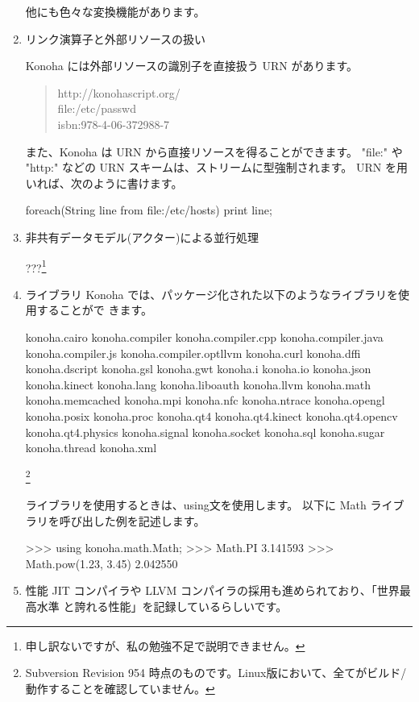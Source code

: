 \documentclass[mingoth,a4paper]{jsarticle}
\begin{document}
\begin{enumerate}
他にも色々な変換機能があります。
\\
\item リンク演算子と外部リソースの扱い

Konoha には外部リソースの識別子を直接扱う URN があります。

\begin{quote}
    http://konohascript.org/\\
    file:/etc/passwd\\
    isbn:978-4-06-372988-7
\end{quote}

また、Konoha は URN から直接リソースを得ることができます。
"file:" や "http:" などの URN スキームは、ストリームに型強制されます。
URN を用いれば、次のように書けます。

\begin{commandline}
foreach(String line from file:/etc/hosts) {
  print line;
}
\end{commandline}

\item 非共有データモデル(アクター)による並行処理

  ???\footnote{申し訳ないですが、私の勉強不足で説明できません。}
\\
\item ライブラリ
Konoha では、パッケージ化された以下のようなライブラリを使用することがで
きます。
\begin{commandline}
  konoha.cairo
  konoha.compiler
  konoha.compiler.cpp
  konoha.compiler.java
  konoha.compiler.js
  konoha.compiler.optllvm
  konoha.curl
  konoha.dffi
  konoha.dscript
  konoha.gsl
  konoha.gwt
  konoha.i
  konoha.io
  konoha.json
  konoha.kinect
  konoha.lang
  konoha.liboauth
  konoha.llvm
  konoha.math
  konoha.memcached
  konoha.mpi
  konoha.nfc
  konoha.ntrace
  konoha.opengl
  konoha.posix
  konoha.proc
  konoha.qt4
  konoha.qt4.kinect
  konoha.qt4.opencv
  konoha.qt4.physics
  konoha.signal
  konoha.socket
  konoha.sql
  konoha.sugar
  konoha.thread
  konoha.xml
\end{commandline}
\footnote{Subversion Revision 954 時点のものです。Linux版において、全てがビルド/動作することを確認していません。}

ライブラリを使用するときは、using文を使用します。
以下に Math ライブラリを呼び出した例を記述します。
\begin{commandline}
>>> using konoha.math.Math;
>>> Math.PI 3.141593
>>> Math.pow(1.23, 3.45)
2.042550
\end{commandline}

\item 性能
JIT コンパイラや LLVM コンパイラの採用も進められており、「世界最高水準
と誇れる性能」を記録しているらしいです。

\end{enumerate}
\end{document}
